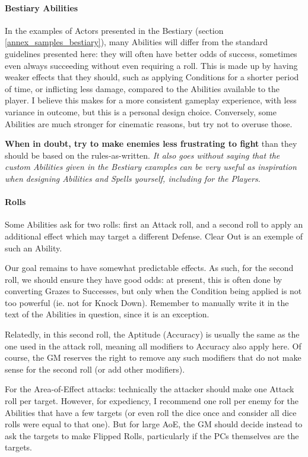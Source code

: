 \paragraph{Bestiary Abilities}

In the examples of Actors presented in the Bestiary (section \ref{annex_samples_bestiary}), many Abilities will differ from the standard guidelines presented here: they will often have better odds of success, sometimes even always succeeding without even requiring a roll. This is made up by having weaker effects that they should, such as applying Conditions for a shorter period of time, or inflicting less damage, compared to the Abilities available to the player. I believe this makes for a more consistent gameplay experience, with less variance in outcome, but this is a personal design choice. Conversely, some Abilities are much stronger for cinematic reasons, but try not to overuse those. 

\textbf{When in doubt, try to make enemies less frustrating to fight} than they should be based on the rules-as-written. \textit{It also goes without saying that the custom Abilities given in the Bestiary examples can be very useful as inspiration when designing Abilities and Spells yourself, including for the Players.}


\paragraph{Rolls}

Some Abilities ask for two rolls: first an Attack roll, and a second roll to apply an additional effect which may target a different Defense. Clear Out is an exemple of such an Ability.

Our goal remains to have somewhat predictable effects. As such, for the second roll, we should ensure they have good odds: at present, this is often done by converting Grazes to Successes, but only when the Condition being applied is not too powerful (ie. not for Knock Down). Remember to manually write it in the text of the Abilities in question, since it is an exception.

Relatedly, in this second roll, the Aptitude (Accuracy) is usually the same as the one used in the attack roll, meaning all modifiers to Accuracy also apply here. Of course, the GM reserves the right to remove any such modifiers that do not make sense for the second roll (or add other modifiers).

For the Area-of-Effect attacks: technically the attacker should make one Attack roll per target. However, for expediency, I recommend one roll per enemy for the Abilities that have a few targets (or even roll the dice once and consider all dice rolls were equal to that one). But for large AoE, the GM should decide instead to ask the targets to make Flipped Rolls, particularly if the PCs themselves are the targets.


